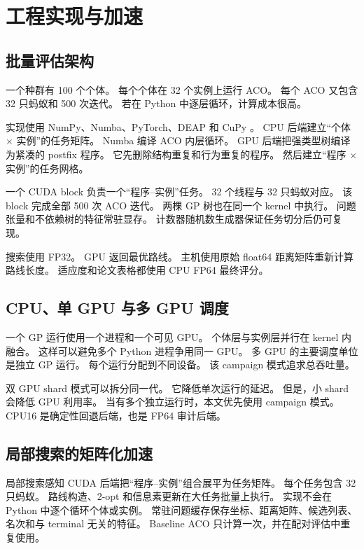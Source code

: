 \documentclass[letterpaper,journal]{IEEEtran}
\begin{document}
\section{工程实现与加速}

\subsection{批量评估架构}

一个种群有 100 个个体。
每个个体在 32 个实例上运行 ACO。
每个 ACO 又包含 32 只蚂蚁和 500 次迭代。
若在 Python 中逐层循环，计算成本很高。

实现使用 NumPy、Numba、PyTorch、DEAP 和 CuPy
\cite{harris2020numpy,lam2015numba,paszke2019pytorch,fortin2012deap,okuta2017cupy}。
CPU 后端建立“个体 \(\times\) 实例”的任务矩阵。
Numba 编译 ACO 内层循环。
GPU 后端把强类型树编译为紧凑的 postfix 程序。
它先删除结构重复和行为重复的程序。
然后建立“程序 \(\times\) 实例”的任务网格。

一个 CUDA block 负责一个“程序--实例”任务。
32 个线程与 32 只蚂蚁对应。
该 block 完成全部 500 次 ACO 迭代。
两棵 GP 树也在同一个 kernel 中执行。
问题张量和不依赖树的特征常驻显存。
计数器随机数生成器保证任务切分后仍可复现。

搜索使用 FP32。
GPU 返回最优路线。
主机使用原始 float64 距离矩阵重新计算路线长度。
适应度和论文表格都使用 CPU FP64 最终评分。

\subsection{CPU、单 GPU 与多 GPU 调度}

一个 GP 运行使用一个进程和一个可见 GPU。
个体层与实例层并行在 kernel 内融合。
这样可以避免多个 Python 进程争用同一 GPU。
多 GPU 的主要调度单位是独立 GP 运行。
每个运行分配到不同设备。
该 campaign 模式追求总吞吐量。

双 GPU shard 模式可以拆分同一代。
它降低单次运行的延迟。
但是，小 shard 会降低 GPU 利用率。
当有多个独立运行时，本文优先使用 campaign 模式。
CPU16 是确定性回退后端，也是 FP64 审计后端。

\subsection{局部搜索的矩阵化加速}

局部搜索感知 CUDA 后端把“程序--实例”组合展平为任务矩阵。
每个任务包含 32 只蚂蚁。
路线构造、2-opt 和信息素更新在大任务批量上执行。
实现不会在 Python 中逐个循环个体或实例。
常驻问题缓存保存坐标、距离矩阵、候选列表、名次和与 terminal 无关的特征。
Baseline ACO 只计算一次，并在配对评估中重复使用。
\end{document}
